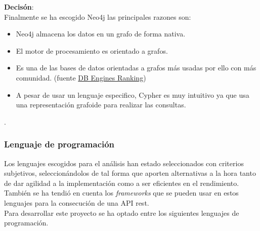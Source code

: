 \textbf{Decisón}:\\
Finalmente se ha escogido Neo4j las principales razones son:
\begin{itemize}
\item Neo4j almacena los datos en un grafo de forma nativa.
\item El motor de procesamiento es orientado a grafos.
\item Es una de las bases de datos orientadas a grafos más usadas por ello con más comunidad. (fuente \href{http://db-engines.com/en/ranking}{DB Engines Ranking})
\item A pesar de usar un lenguaje especifico, Cypher es muy intuitivo ya que usa una representación grafoide para realizar las consultas.
\end{itemize}.


\subsubsection{Lenguaje de programación}
Los lenguajes escogidos para el análisis han estado seleccionados con criterios subjetivos, seleccionándolos de tal forma que aporten alternativas a la hora tanto de dar agilidad a la implementación como a ser eficientes en el rendimiento. También se ha tendió en cuenta los \textit{frameworks} que se pueden usar en estos lenguajes para la consecución de una API rest.\\Para desarrollar este proyecto se ha optado entre los siguientes lenguajes de programación.

